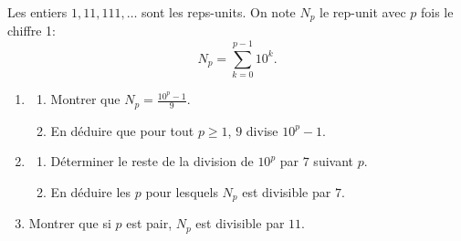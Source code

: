 \documentclass[a4paper,12pt]{article}
\begin{document}
\begin{exercice}[title=Exercice 28 $\quad \star \star \quad$ { [Communiquer, Calculer]}]{}{}
Les entiers $1,11,111,\dots$ sont les reps-units. On note $N_p$ le rep-unit avec $p$ fois le chiffre 1:
\[
N_p=\sum_{k=0}^{p-1}10^k.
\]
\begin{enumerate}
    \item 
    \begin{enumerate}
        \item Montrer que $N_p=\frac{10^p -1}{9}$.
        \item En déduire que pour tout $p \geq 1$, $9$ divise $10^p -1$.
    \end{enumerate}
    \item 
    \begin{enumerate}
        \item Déterminer le reste de la division de $10^p$ par $7$ suivant $p$.
        \item En déduire les $p$ pour lesquels $N_p$ est divisible par $7$.
    \end{enumerate}
    \item Montrer que si $p$ est pair, $N_p$ est divisible par $11$.
\end{enumerate}
\end{exercice}
\end{document}
